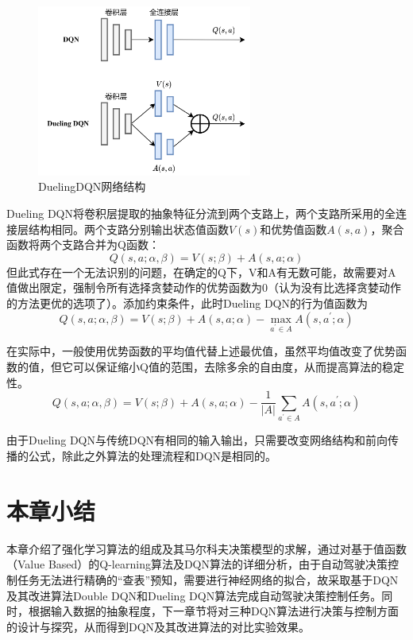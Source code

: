 \begin{figure}[htbp]
    \vspace{13pt} %
    \centering
    \includegraphics[width=0.63\textwidth]{images/chapter2/Dueling_DQN.png}
    \caption{DuelingDQN网络结构}\label{DuelingDQN网络结构} %
\end{figure}

Dueling DQN将卷积层提取的抽象特征分流到两个支路上，两个支路所采用的全连接层结构相同。两个支路分别输出状态值函数$V(s)$和优势值函数$A(s,a)$，聚合函数将两个支路合并为Q函数：
\begin{equation*}
    Q(s,a;\alpha,\beta) = V(s;\beta) + A(s,a;\alpha)
\end{equation*}
但此式存在一个无法识别的问题，在确定的Q下，V和A有无数可能，故需要对A值做出限定，强制令所有选择贪婪动作的优势函数为0（认为没有比选择贪婪动作的方法更优的选项了）。添加约束条件，此时Dueling DQN的行为值函数为
\begin{equation}
    Q(s,a;\alpha,\beta) = V(s;\beta) + A(s,a;\alpha) - \max_{a^{'} \in A}A(s,a^{'};\alpha)
\end{equation}

在实际中，一般使用优势函数的平均值代替上述最优值，虽然平均值改变了优势函数的值，但它可以保证缩小Q值的范围，去除多余的自由度，从而提高算法的稳定性。
\begin{equation}
    Q(s,a;\alpha,\beta) = V(s;\beta) + A(s,a;\alpha) - \frac{1}{\left | A \right | } \sum_{a^{'} \in A}A(s,a^{'};\alpha)
\end{equation}

由于Dueling DQN与传统DQN有相同的输入输出，只需要改变网络结构和前向传播的公式，除此之外算法的处理流程和DQN是相同的。

\section{本章小结}%

本章介绍了强化学习算法的组成及其马尔科夫决策模型的求解，通过对基于值函数（Value Based）的Q-learning算法及DQN算法的详细分析，由于自动驾驶决策控制任务无法进行精确的“查表”预知，需要进行神经网络的拟合，故采取基于DQN及其改进算法Double DQN和Dueling DQN算法完成自动驾驶决策控制任务。同时，根据输入数据的抽象程度，下一章节将对三种DQN算法进行决策与控制方面的设计与探究，从而得到DQN及其改进算法的对比实验效果。

